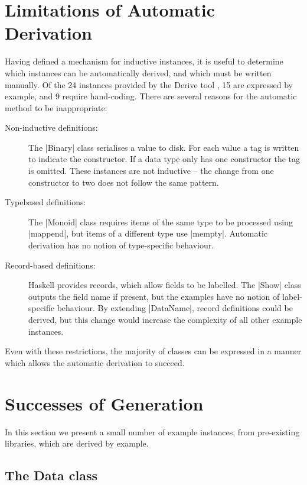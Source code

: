 \documentclass{llncs}
\begin{document}
\section{Limitations of Automatic Derivation}
\label{sec:automatic_failure}

Having defined a mechanism for inductive instances, it is useful to determine which instances can be automatically derived, and which must be written manually. Of the 24 instances provided by the Derive tool \cite{derive}, 15 are expressed by example, and 9 require hand-coding. There are several reasons for the automatic method to be inappropriate:

\begin{description}

\item[Non-inductive definitions:] The |Binary| class serialises a value to disk. For each value a tag is written to indicate the constructor. If a data type only has one constructor the tag is omitted. These instances are not inductive -- the change from one constructor to two does not follow the same pattern.

\item[Typebased definitions:] The |Monoid| class requires items of the same type to be processed using |mappend|, but items of a different type use |mempty|. Automatic derivation has no notion of type-specific behaviour.

\item [Record-based definitions:] Haskell provides records, which allow fields to be labelled. The |Show| class outputs the field name if present, but the examples have no notion of label-specific behaviour. By extending |DataName|, record definitions could be derived, but this change would increase the complexity of all other example instances.

\end{description}

Even with these restrictions, the majority of classes can be expressed in a manner which allows the automatic derivation to succeed.

\section{Successes of Generation}
\label{sec:automatic_success}

In this section we present a small number of example instances, from pre-existing libraries, which are derived by example.

\subsection{The Data class}
\end{document}
